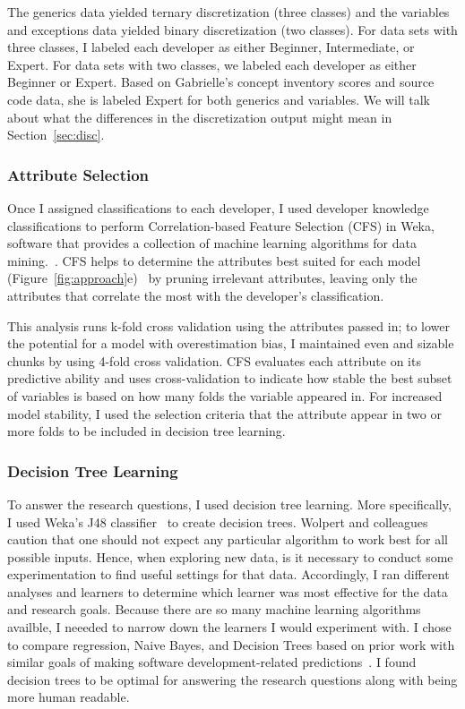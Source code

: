 The generics data yielded ternary discretization (three classes) and the variables and exceptions data yielded binary discretization (two classes). For data sets with three classes, I labeled each developer as either Beginner, Intermediate, or Expert. For data sets with two classes, we labeled each developer as either Beginner or Expert.	
Based on Gabrielle's concept inventory scores and source code data, she is labeled Expert for both generics and variables. 
We will talk about what the differences in the discretization output might mean in Section~\ref{sec:disc}.

\subsubsection{Attribute Selection}
Once I assigned classifications to each developer, I used developer knowledge classifications to perform Correlation-based Feature Selection (CFS) in Weka, software that provides a collection of machine learning algorithms for data mining.~\cite{Hall:2009:WDM:1656274.1656278}. CFS helps to determine the attributes best suited for each model (Figure~\ref{fig:approach}e)~\cite{hall1999correlation} by pruning irrelevant attributes, leaving only the attributes that correlate the most with the developer's classification.

This analysis runs k-fold cross validation using the attributes passed in; to lower the potential for a model with overestimation bias, I maintained even and sizable chunks by using 4-fold cross validation.	
CFS evaluates each attribute on its predictive ability and uses cross-validation to indicate how stable the best subset of variables is based on how many folds the variable appeared in.
For increased model stability, I used the selection criteria that the attribute appear in two or more folds to be included in decision tree learning.

\subsubsection{Decision Tree Learning}
To answer the research questions, I used decision tree learning. 
More specifically, I used Weka's J48 classifier~\cite{witten1999weka} to create decision trees. 
Wolpert and colleagues~\cite{wolpert1997no} caution that one should not expect any particular algorithm to work best for all possible inputs. Hence, when exploring new data, is it necessary to conduct some experimentation to find useful settings for that data. Accordingly, I ran different analyses and learners to determine which learner was most effective for the data and research goals. Because there are so many machine learning algorithms availble, I neeeded to narrow down the learners I would experiment with. I chose to compare regression, Naive Bayes, and Decision Trees based on prior work with similar goals of making software development-related predictions~\cite{menzies2004assessing,menzies2007data,heckman2009model,fritz2010degree}. I found decision trees to be optimal for answering the research questions along with being more human readable.

